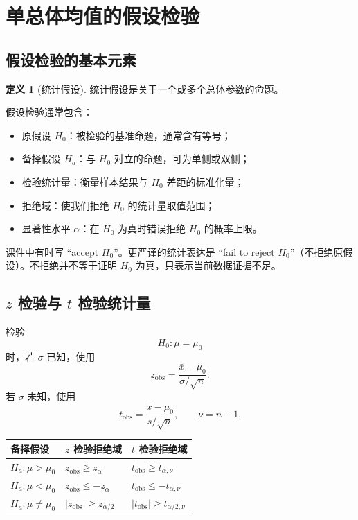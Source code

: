 \documentclass[11pt,a4paper]{article}
\theoremstyle{definition}
\newtheorem{definition}{定义}[section]
\theoremstyle{plain}
\theoremstyle{remark}
\begin{document}
\section{单总体均值的假设检验}
\label{sec:one-mean-test}

\subsection{假设检验的基本元素}

\begin{definition}[统计假设]
统计假设是关于一个或多个总体参数的命题。
\end{definition}

假设检验通常包含：
\begin{itemize}
    \item 原假设 $H_0$：被检验的基准命题，通常含有等号；
    \item 备择假设 $H_a$：与 $H_0$ 对立的命题，可为单侧或双侧；
    \item 检验统计量：衡量样本结果与 $H_0$ 差距的标准化量；
    \item 拒绝域：使我们拒绝 $H_0$ 的统计量取值范围；
    \item 显著性水平 $\alpha$：在 $H_0$ 为真时错误拒绝 $H_0$ 的概率上限。
\end{itemize}

\begin{warnbox}[结论措辞]
课件中有时写 “accept $H_0$”。更严谨的统计表达是 “fail to reject $H_0$”（不拒绝原假设）。不拒绝并不等于证明 $H_0$ 为真，只表示当前数据证据不足。
\end{warnbox}

\subsection{\texorpdfstring{$z$ 检验与 $t$ 检验统计量}{z 检验与 t 检验统计量}}

检验
\[
    H_0:\mu=\mu_0
\]
时，若 $\sigma$ 已知，使用
\[
    z_{\text{obs}}=\frac{\bar x-\mu_0}{\sigma/\sqrt n}.
\]
若 $\sigma$ 未知，使用
\[
    t_{\text{obs}}=\frac{\bar x-\mu_0}{s/\sqrt n},\qquad \nu=n-1.
\]

\begin{memorybox}
\begin{center}
\begin{tabular}{lll}
\toprule
备择假设 & $z$ 检验拒绝域 & $t$ 检验拒绝域\\
\midrule
$H_a:\mu>\mu_0$ & $z_{\text{obs}}\ge z_\alpha$ & $t_{\text{obs}}\ge t_{\alpha,\nu}$\\
$H_a:\mu<\mu_0$ & $z_{\text{obs}}\le -z_\alpha$ & $t_{\text{obs}}\le -t_{\alpha,\nu}$\\
$H_a:\mu\ne\mu_0$ & $|z_{\text{obs}}|\ge z_{\alpha/2}$ & $|t_{\text{obs}}|\ge t_{\alpha/2,\nu}$\\
\bottomrule
\end{tabular}
\end{center}
\end{memorybox}
\end{document}
